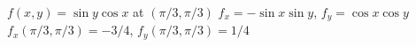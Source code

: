 {$f(x,y) = \sin y\cos x$ at $(\pi/3,\pi/3)$
}
{$f_x=-\sin x\sin y$, $f_y=\cos x\cos y$\\
$f_x(\pi/3,\pi/3) = -3/4$, $f_y(\pi/3,\pi/3) = 1/4$
}